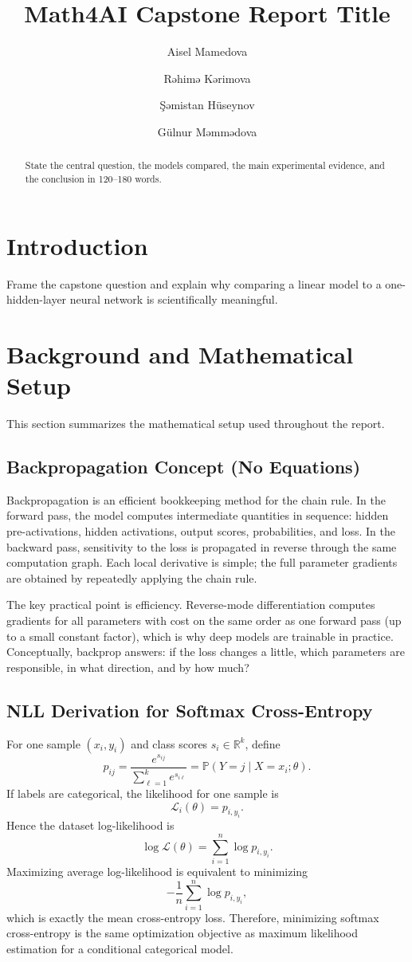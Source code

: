 \documentclass[11pt]{article}
\title{Math4AI Capstone Report Title}
\author{Aisel Mamedova \and Rəhimə Kərimova \and Şəmistan Hüseynov \and Gülnur Məmmədova}
\date{}
\begin{document}
\maketitle

\begin{abstract}
State the central question, the models compared, the main experimental evidence, and the conclusion in 120--180 words.
\end{abstract}

\section{Introduction}
Frame the capstone question and explain why comparing a linear model to a one-hidden-layer neural network is scientifically meaningful.

\section{Background and Mathematical Setup}
This section summarizes the mathematical setup used throughout the report.

\subsection{Backpropagation Concept (No Equations)}
Backpropagation is an efficient bookkeeping method for the chain rule. In the forward pass, the model computes intermediate quantities in sequence: hidden pre-activations, hidden activations, output scores, probabilities, and loss. In the backward pass, sensitivity to the loss is propagated in reverse through the same computation graph. Each local derivative is simple; the full parameter gradients are obtained by repeatedly applying the chain rule.

The key practical point is efficiency. Reverse-mode differentiation computes gradients for all parameters with cost on the same order as one forward pass (up to a small constant factor), which is why deep models are trainable in practice. Conceptually, backprop answers: if the loss changes a little, which parameters are responsible, in what direction, and by how much?

\subsection{NLL Derivation for Softmax Cross-Entropy}
For one sample $(x_i,y_i)$ and class scores $s_i \in \mathbb{R}^k$, define
\[
p_{ij} = \frac{e^{s_{ij}}}{\sum_{\ell=1}^k e^{s_{i\ell}}}
      = \mathbb{P}(Y=j \mid X=x_i; \theta).
\]
If labels are categorical, the likelihood for one sample is
\[
\mathcal{L}_i(\theta) = p_{i,y_i}.
\]
Hence the dataset log-likelihood is
\[
\log \mathcal{L}(\theta)=\sum_{i=1}^n \log p_{i,y_i}.
\]
Maximizing average log-likelihood is equivalent to minimizing
\[
-\frac{1}{n}\sum_{i=1}^n \log p_{i,y_i},
\]
which is exactly the mean cross-entropy loss. Therefore, minimizing softmax cross-entropy is the same optimization objective as maximum likelihood estimation for a conditional categorical model.
\end{document}
